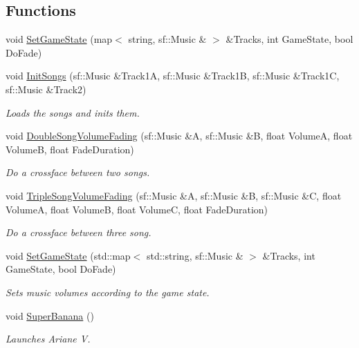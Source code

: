 \subsection*{Functions}
\begin{DoxyCompactItemize}
\item 
void \hyperlink{namespace_chase_game_af423e47c7318b7eeb67ff1f1a6b1547d}{Set\-Game\-State} (map$<$ string, sf\-::\-Music \& $>$ \&Tracks, int Game\-State, bool Do\-Fade)
\item 
void \hyperlink{namespace_chase_game_af1b7d4727ff31281f8efdf46175e94c3}{Init\-Songs} (sf\-::\-Music \&Track1\-A, sf\-::\-Music \&Track1\-B, sf\-::\-Music \&Track1\-C, sf\-::\-Music \&Track2)
\begin{DoxyCompactList}\small\item\em Loads the songs and inits them. \end{DoxyCompactList}\item 
void \hyperlink{namespace_chase_game_a1fafa6862bb2df06c93d286361fefaa4}{Double\-Song\-Volume\-Fading} (sf\-::\-Music \&A, sf\-::\-Music \&B, float Volume\-A, float Volume\-B, float Fade\-Duration)
\begin{DoxyCompactList}\small\item\em Do a crossface between two songs. \end{DoxyCompactList}\item 
void \hyperlink{namespace_chase_game_a3b9e1d486d981f5332d23142eb4777b7}{Triple\-Song\-Volume\-Fading} (sf\-::\-Music \&A, sf\-::\-Music \&B, sf\-::\-Music \&C, float Volume\-A, float Volume\-B, float Volume\-C, float Fade\-Duration)
\begin{DoxyCompactList}\small\item\em Do a crossface between three song. \end{DoxyCompactList}\item 
void \hyperlink{namespace_chase_game_ac628bcb1f9de7ece2d9705ea5c6e9e91}{Set\-Game\-State} (std\-::map$<$ std\-::string, sf\-::\-Music \& $>$ \&Tracks, int Game\-State, bool Do\-Fade)
\begin{DoxyCompactList}\small\item\em Sets music volumes according to the game state. \end{DoxyCompactList}\item 
void \hyperlink{namespace_chase_game_a19b95183bbaf6684ffc6511a4f9922f5}{Super\-Banana} ()
\begin{DoxyCompactList}\small\item\em Launches Ariane V. \end{DoxyCompactList}\item 

\end{DoxyCompactItemize}
